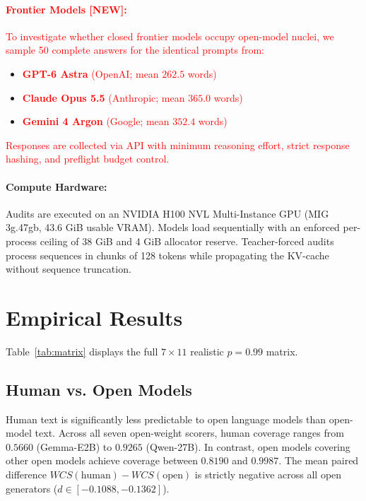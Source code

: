 \documentclass[11pt,a4paper,twocolumn]{article}
\newcommand{\diff}[1]{\textcolor{red}{#1}}
\begin{document}
\paragraph{\diff{Frontier Models [NEW]:}} \diff{To investigate whether closed frontier models occupy open-model nuclei, we sample 50 complete answers for the identical prompts from:}
\begin{itemize}
    \item \diff{\textbf{GPT-6 Astra} (OpenAI; mean $262.5$ words)}
    \item \diff{\textbf{Claude Opus 5.5} (Anthropic; mean $365.0$ words)}
    \item \diff{\textbf{Gemini 4 Argon} (Google; mean $352.4$ words)}
\end{itemize}
\diff{Responses are collected via API with minimum reasoning effort, strict response hashing, and preflight budget control.}

\paragraph{Compute Hardware:} Audits are executed on an NVIDIA H100 NVL Multi-Instance GPU (MIG 3g.47gb, 43.6 GiB usable VRAM). Models load sequentially with an enforced per-process ceiling of 38 GiB and 4 GiB allocator reserve. Teacher-forced audits process sequences in chunks of 128 tokens while propagating the KV-cache without sequence truncation.

\section{Empirical Results}

Table~\ref{tab:matrix} displays the full $7 \times 11$ realistic $p=0.99$ matrix.

\subsection{Human vs. Open Models}
Human text is significantly less predictable to open language models than open-model text. Across all seven open-weight scorers, human coverage ranges from $0.5660$ (Gemma-E2B) to $0.9265$ (Qwen-27B). In contrast, open models covering other open models achieve coverage between $0.8190$ and $0.9987$. The mean paired difference $WCS(\text{human}) - WCS(\text{open})$ is strictly negative across all open generators ($d \in [-0.1088, -0.1362]$).
\end{document}
